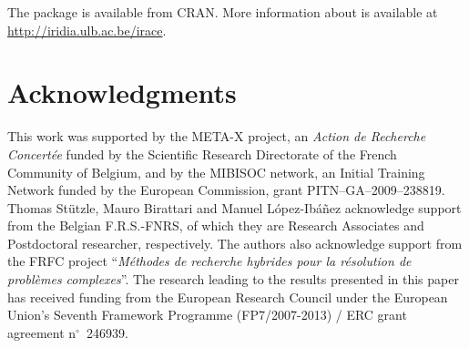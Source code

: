 \documentclass[article,a4paper,nojss,notitle]{jss}
\newcommand{\irace}{\pkg{irace}\xspace}
\begin{document}
The \irace package is available from CRAN. More information
about \irace is available at \url{http://iridia.ulb.ac.be/irace}.



\section*{Acknowledgments}
This work was supported by the
META-X project, an \emph{Action de Recherche Concert\'ee} funded by
the Scientific Research Directorate of the French Community of
Belgium, and by the MIBISOC network, an Initial Training Network
funded by the European Commission, grant PITN--GA--2009--238819.
Thomas St\"utzle, Mauro Birattari and Manuel L\'opez-Ib\'a\~nez acknowledge support from the Belgian 
F.R.S.-FNRS, of which they are Research Associates and Postdoctoral researcher, respectively. 
The authors also acknowledge support
from the FRFC project ``\emph{M{\'e}thodes de recherche hybrides pour
  la r{\'e}solution de probl{\`e}mes complexes}''. The research leading to the results presented in this paper has received funding from the European Research Council under the European Union's Seventh Framework Programme (FP7/2007-2013) / ERC grant agreement n$^\circ$~246939. 
\end{document}
